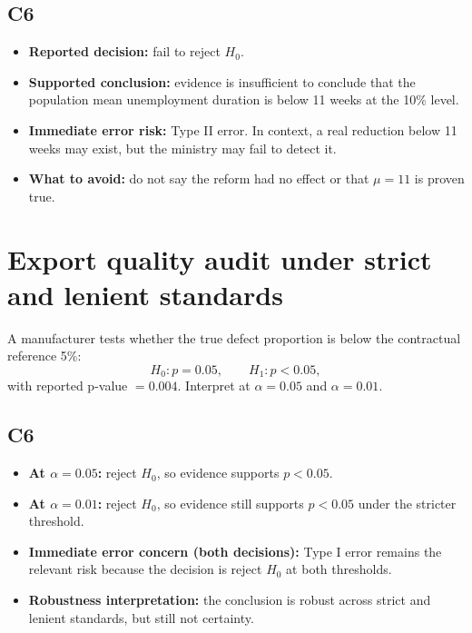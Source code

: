 	\subsection*{C6}
	\begin{itemize}
		\item \textbf{Reported decision:} fail to reject \(H_0\).
		\item \textbf{Supported conclusion:} evidence is insufficient to conclude that the population mean unemployment duration is below 11 weeks at the 10\% level.
		\item \textbf{Immediate error risk:} Type II error. In context, a real reduction below 11 weeks may exist, but the ministry may fail to detect it.
		\item \textbf{What to avoid:} do not say the reform had no effect or that \(\mu=11\) is proven true.
	\end{itemize}
	
	\section{Export quality audit under strict and lenient standards}
	A manufacturer tests whether the true defect proportion is below the contractual reference 5\%:
	\[
	H_0\colon p=0.05,\qquad H_1\colon p<0.05,
	\]
	with reported p-value \(=0.004\). Interpret at \(\alpha=0.05\) and \(\alpha=0.01\).
	
	\begin{center}
		\hspace{0.8cm}
	\end{center}
	
	\subsection*{C6}
	\begin{itemize}
		\item \textbf{At \(\alpha=0.05\):} reject \(H_0\), so evidence supports \(p<0.05\).
		\item \textbf{At \(\alpha=0.01\):} reject \(H_0\), so evidence still supports \(p<0.05\) under the stricter threshold.
		\item \textbf{Immediate error concern (both decisions):} Type I error remains the relevant risk because the decision is reject \(H_0\) at both thresholds.
		\item \textbf{Robustness interpretation:} the conclusion is robust across strict and lenient standards, but still not certainty.
	\end{itemize}
	
